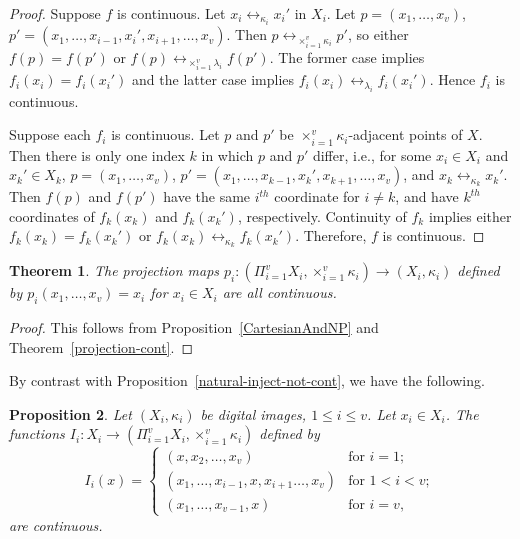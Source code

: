 \documentclass{article}
\theoremstyle{plain}
\newtheorem{thm}{Theorem}
\newtheorem{prop}[thm]{Proposition}
\theoremstyle{definition}
\numberwithin{thm}{section}
\newcommand{\adj}{\leftrightarrow}
\begin{document}
\begin{proof}
Suppose $f$ is continuous.
Let $x_i \adj_{\kappa_i} x_i'$ in
$X_i$. Let
$p=(x_1,\ldots,x_v)$,
$p'=(x_1,\ldots,x_{i-1},x_i',x_{i+1},\ldots,x_v)$.
Then $p \adj_{\times_{i=1}^v \kappa_i} p'$, so either $f(p)=f(p')$ or $f(p) \adj_{\times_{i=1}^v \lambda_i} f(p')$. The former case implies
$f_i(x_i)=f_i(x_i')$ and the latter
case implies $f_i(x_i) \adj_{\lambda_i} f_i(x_i')$. Hence
$f_i$ is continuous.

Suppose each $f_i$ is continuous.
Let $p$ and $p'$ be
$\times_{i=1}^v \kappa_i$-adjacent points of
$X$. Then there is only one index $k$ in which $p$ and $p'$ differ, i.e., for some
$x_i \in X_i$ and $x_k' \in X_k$,
$p=(x_1, \ldots, x_v)$,
$p'=(x_1, \ldots,x_{k-1},x_k', x_{k+1}, \ldots, x_v)$, and
$x_k \adj_{\kappa_k}x_k'$.
Then $f(p)$ and $f(p')$ have the
same $i^{th}$ coordinate for
$i \neq k$, and have
$k^{th}$ coordinates of
$f_k(x_k)$ and $f_k(x_k')$, respectively. Continuity of
$f_k$ implies either $f_k(x_k)=f_k(x_k')$ or
$f_k(x_k) \adj_{\kappa_k} f_k(x_k')$. Therefore, $f$ is
continuous.
\end{proof}

\begin{thm}
\label{product-projection-cont}
The projection maps
$p_i: (\Pi_{i=1}^v X_i, \times_{i=1}^v \kappa_i) \to (X_i, \kappa_i)$
defined by $p_i(x_1, \ldots, x_v) = x_i$
for $x_i \in X_i$ are all continuous.
\end{thm}

\begin{proof}
This follows from Proposition~\ref{CartesianAndNP} and Theorem~\ref{projection-cont}.
\end{proof}

By contrast with Proposition~\ref{natural-inject-not-cont}, we have the following.

\begin{prop}
\label{natural-inject-product-cont}
Let $(X_i,\kappa_i)$ be digital images, $1 \le i \le v$.
Let $x_i \in X_i$. The
functions $I_i: X_i \to (\Pi_{i=1}^v X_i,\times_{i=1}^v \kappa_i)$ defined by
\[ I_i(x)= \left \{ \begin{array}{ll}
(x,x_2, \ldots, x_v) & \mbox{for } i=1; \\
(x_1, \ldots, x_{i-1}, x, x_{i+1} \ldots,
 x_v) & \mbox{for } 1 < i < v; \\
 (x_1, \ldots, x_{v-1}, x) & \mbox{for } i=v,
\end{array} \right .
\]
are continuous.
\end{prop}
\end{document}
